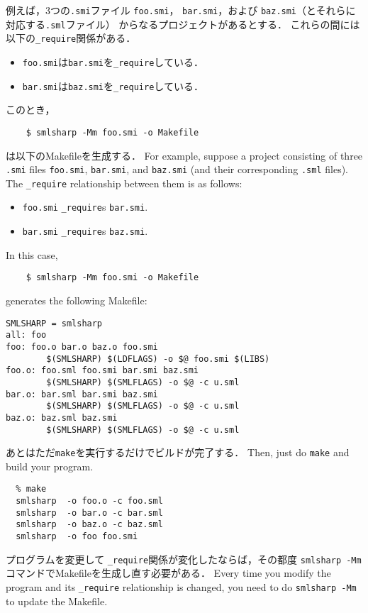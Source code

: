 \documentclass{jbook}
\begin{document}
\ifjp%
	例えば，3つの{\tt .smi}ファイル
{\tt foo.smi}，
{\tt bar.smi}，および
{\tt baz.smi}（とそれらに対応する{\tt .sml}ファイル）
からなるプロジェクトがあるとする．
        これらの間には以下の{\tt \_require}関係がある．
\begin{itemize}
\item {\tt foo.smi}は{\tt bar.smi}を{\tt \_require}している．
\item {\tt bar.smi}は{\tt baz.smi}を{\tt \_require}している．
\end{itemize}
        このとき，
\begin{verbatim}
    $ smlsharp -Mm foo.smi -o Makefile
\end{verbatim}
は以下のMakefileを生成する．
\else%
        For example, suppose a project consisting of
three {\tt .smi} files
{\tt foo.smi},
{\tt bar.smi}, and
{\tt baz.smi} (and their corresponding {\tt .sml} files).
	The {\tt \_require} relationship between them is as follows:
\begin{itemize}
\item {\tt foo.smi} {\tt \_require}s {\tt bar.smi}.
\item {\tt bar.smi} {\tt \_require}s {\tt baz.smi}.
\end{itemize}
        In this case,
\begin{verbatim}
    $ smlsharp -Mm foo.smi -o Makefile
\end{verbatim}
generates the following Makefile:
\fi%
\begin{verbatim}
SMLSHARP = smlsharp
all: foo
foo: foo.o bar.o baz.o foo.smi
        $(SMLSHARP) $(LDFLAGS) -o $@ foo.smi $(LIBS)
foo.o: foo.sml foo.smi bar.smi baz.smi
        $(SMLSHARP) $(SMLFLAGS) -o $@ -c u.sml
bar.o: bar.sml bar.smi baz.smi
        $(SMLSHARP) $(SMLFLAGS) -o $@ -c u.sml
baz.o: baz.sml baz.smi
        $(SMLSHARP) $(SMLFLAGS) -o $@ -c u.sml
\end{verbatim}
\ifjp%
	あとはただ{\tt make}を実行するだけでビルドが完了する．
\else%
        Then, just do {\tt make} and build your program.
\fi%
\begin{verbatim}
  % make
  smlsharp  -o foo.o -c foo.sml
  smlsharp  -o bar.o -c bar.sml
  smlsharp  -o baz.o -c baz.sml
  smlsharp  -o foo foo.smi
\end{verbatim}
\ifjp%
	プログラムを変更して
{\tt \_require}関係が変化したならば，その都度
{\tt smlsharp -Mm}コマンドでMakefileを生成し直す必要がある．
\else%
        Every time you modify the program and its {\tt \_require}
relationship is changed, you need to do {\tt smlsharp -Mm} to update
the Makefile.
\fi%
\end{document}
